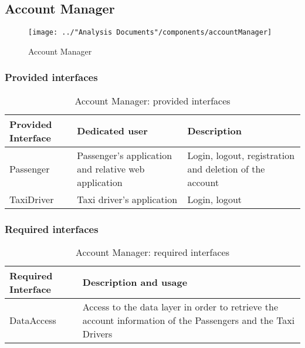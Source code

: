 \subsection{Account Manager}
\begin{figure}[H]
	\centering
	\texttt{[image: ../"Analysis Documents"/components/accountManager]}
	\label{fig:accountManager}
	\caption{Account Manager}
\end{figure}
\subsubsection{Provided interfaces}
\begin{table}[H]
\begin{longtable}{| p{} | p{} | p{} |}
\hline
 \textbf{Provided Interface} & \textbf{Dedicated user} & \textbf{Description} \\ \hline
Passenger & Passenger's application and relative web application & Login, logout, registration and deletion of the account \\ \hline
TaxiDriver & Taxi driver's application & Login, logout \\ \hline
\end{longtable}
\caption{Account Manager: provided interfaces}
\label{tab:accountManager:providedInterfaces}
\end{table}
\subsubsection{Required interfaces}
\begin{table}[H]
\begin{longtable}{| l | p{} |}
\hline
 \textbf{Required Interface} & \textbf{Description and usage} \\ \hline
DataAccess & Access to the data layer in order to retrieve the account information of the Passengers and the Taxi Drivers \\ \hline
\end{longtable}
\caption{Account Manager: required interfaces}
\label{tab:accountManager:requiredInterfaces}
\end{table}

